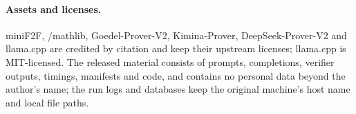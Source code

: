 \paragraph{Assets and licenses.}
miniF2F, \lean{}/mathlib, Goedel-Prover-V2, Kimina-Prover, DeepSeek-Prover-V2 and llama.cpp are credited by citation and keep their upstream licenses; llama.cpp is MIT-licensed.  The released material consists of prompts, completions, verifier outputs, timings, manifests and code, and contains no personal data beyond the author's name; the run logs and databases keep the original machine's host name and local file paths.
